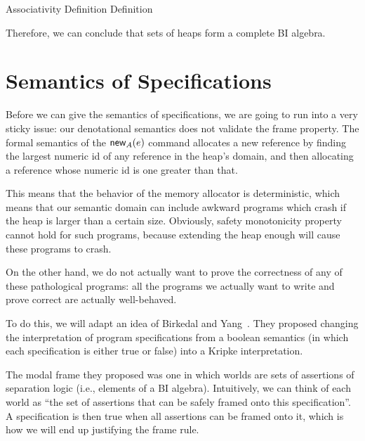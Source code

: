 \begin{itemize}
\begin{eqnproof}
           {Associativity}
            {Definition}
          {Definition}
  \end{eqnproof}
\end{itemize}

Therefore, we can conclude that sets of heaps form a complete BI algebra. 

\section{Semantics of Specifications}

Before we can give the semantics of specifications, we are going to run
into a very sticky issue: our denotational semantics does not validate
the frame property. The formal semantics of the $\mathsf{new}_{A}(e)$
command allocates a new reference by finding the largest numeric id of
any reference in the heap's domain, and then allocating a reference
whose numeric id is one greater than that.

This means that the behavior of the memory allocator is deterministic,
which means that our semantic domain can include awkward programs
which crash if the heap is larger than a certain size. Obviously,
safety monotonicity property cannot hold for such programs, because
extending the heap enough will cause these programs to crash.  
 
On the other hand, we do not actually want to prove the correctness of
any of these pathological programs: all the programs we actually want
to write and prove correct are actually well-behaved.

To do this, we will adapt an idea of Birkedal and
Yang~\cite{birkedal-yang}. They proposed changing the interpretation
of program specifications from a boolean semantics (in which each
specification is either true or false) into a Kripke interpretation.

The modal frame they proposed was one in which worlds are sets of
assertions of separation logic (i.e., elements of a BI algebra).
Intuitively, we can think of each world as ``the set of assertions
that can be safely framed onto this specification''. A specification
is then true when all assertions can be framed onto it, which is how
we will end up justifying the frame rule.

